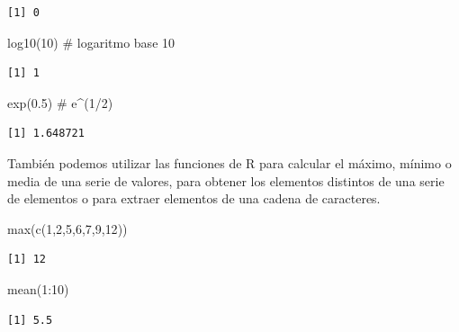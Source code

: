 \documentclass[
  letterpaper,
  DIV=11,
  numbers=noendperiod]{scrreprt}
\newenvironment{Shaded}{\begin{snugshade}}{\end{snugshade}}
\newcommand{\CommentTok}[1]{\textcolor[rgb]{0.37,0.37,0.37}{#1}}
\newcommand{\DecValTok}[1]{\textcolor[rgb]{0.68,0.00,0.00}{#1}}
\newcommand{\FloatTok}[1]{\textcolor[rgb]{0.68,0.00,0.00}{#1}}
\newcommand{\FunctionTok}[1]{\textcolor[rgb]{0.28,0.35,0.67}{#1}}
\newcommand{\NormalTok}[1]{\textcolor[rgb]{0.00,0.23,0.31}{#1}}
\newcommand{\SpecialCharTok}[1]{\textcolor[rgb]{0.37,0.37,0.37}{#1}}
\begin{document}
\begin{verbatim}
[1] 0
\end{verbatim}

\begin{Shaded}
\begin{Highlighting}[]
\FunctionTok{log10}\NormalTok{(}\DecValTok{10}\NormalTok{) }\CommentTok{\# logaritmo base 10}
\end{Highlighting}
\end{Shaded}

\begin{verbatim}
[1] 1
\end{verbatim}

\begin{Shaded}
\begin{Highlighting}[]
\FunctionTok{exp}\NormalTok{(}\FloatTok{0.5}\NormalTok{) }\CommentTok{\# e\^{}(1/2)}
\end{Highlighting}
\end{Shaded}

\begin{verbatim}
[1] 1.648721
\end{verbatim}

También podemos utilizar las funciones de R para calcular el máximo,
mínimo o media de una serie de valores, para obtener los elementos
distintos de una serie de elementos o para extraer elementos de una
cadena de caracteres.

\begin{Shaded}
\begin{Highlighting}[]
\FunctionTok{max}\NormalTok{(}\FunctionTok{c}\NormalTok{(}\DecValTok{1}\NormalTok{,}\DecValTok{2}\NormalTok{,}\DecValTok{5}\NormalTok{,}\DecValTok{6}\NormalTok{,}\DecValTok{7}\NormalTok{,}\DecValTok{9}\NormalTok{,}\DecValTok{12}\NormalTok{))}
\end{Highlighting}
\end{Shaded}

\begin{verbatim}
[1] 12
\end{verbatim}

\begin{Shaded}
\begin{Highlighting}[]
\FunctionTok{mean}\NormalTok{(}\DecValTok{1}\SpecialCharTok{:}\DecValTok{10}\NormalTok{)}
\end{Highlighting}
\end{Shaded}

\begin{verbatim}
[1] 5.5
\end{verbatim}
\end{document}
